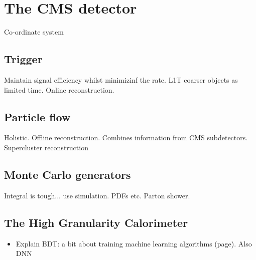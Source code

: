 \chapter{The CMS detector}
\label{chap:cms}

Co-ordinate system

\section{Trigger}\label{sec:trigger}
Maintain signal efficiency whilst minimizinf the rate. L1T coarser objects as limited time. Online reconstruction.

\section{Particle flow}\label{sec:particle_flow}
Holistic.
Offline reconstruction. Combines information from CMS subdetectors. Supercluster reconstruction

\section{Monte Carlo generators}
Integral is tough... use simulation. PDFs etc. Parton shower.

\section{The High Granularity Calorimeter}
\begin{itemize}
    \item Explain BDT: a bit about training machine learning algorithms (page). Also DNN
\end{itemize}
